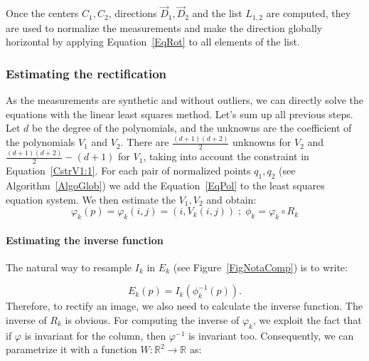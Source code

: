 \documentclass{ipol}
\newcommand{\RR}{\ensuremath{\mathbb{R}}}
\newcommand{\er}[1]{\textcolor{orange}{#1}}
\begin{document}

Once the centers $C_1,C_2$, directions   $\vec{D}_1,\vec{D}_2$  and the list $L_{1,2}$ are computed,
they are used to normalize the measurements and make the direction globally
horizontal by applying Equation~\eqref{EqRot} to all elements of the list.


\subsubsection{Estimating the rectification}

As the measurements are synthetic and without outliers, we can directly solve
the equations with the linear least squares  method. Let's sum up all previous steps. Let $d$ be the degree of the polynomials, and the unknowns are the coefficient of the polynomials $V_1$ and $V_2$. There are
          $\frac{(d+1)(d+2)}{2}$ unknowns for $V_2$ and $\frac{(d+1)(d+2)}{2}-(d+1) $  for $V_1$,
          taking into account the  constraint in Equation~\eqref{CstrV1:1}. For each pair of normalized points $q_1,q_2$ (see Algorithm~\ref{AlgoGlob}) we add 
          the Equation~\eqref{EqPol} to the least squares equation system. We then estimate the $V_1,V_2$ and obtain:
%
\begin{equation}
  \varphi_k(p) = \varphi_k(i,j) = (i,V_k(i,j))  \;;\;    \phi_k =  \varphi_k  \circ R_k 
\end{equation} 
%


\paragraph{Estimating the inverse function}

The natural way to resample  $I_k$ in $E_k$ (see Figure~\ref{FigNotaComp}) is to write:

\begin{equation}
  E_k(p) = I_k(\phi^{-1}_k(p)).
\end{equation}
Therefore, to rectify an image, we also need to calculate the inverse function. The inverse of $R_k$ is obvious. For computing the inverse of $\varphi_k$,  we
exploit the fact that if $\varphi$ is invariant for the column, then $\varphi^{-1}$ is invariant too. Consequently, we can parametrize it with a function $W: \RR^2 \rightarrow \RR$ as:
\end{document}
